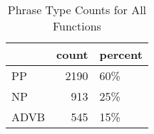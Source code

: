 \begin{table}[htbp!]
\centering
\caption{Phrase Type Counts for All Functions}
\label{table:allf_pht_cp}
\begin{tabular}{lrl}
\toprule
{} &  count & percent \\
\midrule
PP   &   2190 &     60\% \\
NP   &    913 &     25\% \\
ADVB &    545 &     15\% \\
\bottomrule
\end{tabular}
\end{table}
